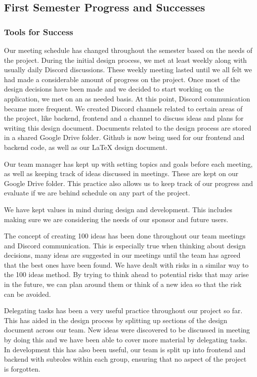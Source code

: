 \subsection{First Semester Progress and Successes}
\subsubsection{Tools for Success}
Our meeting schedule has changed throughout the semester based on the needs of the project. During the initial design process, we met at least weekly along with usually daily Discord discussions. These weekly meeting lasted until we all felt we had made a considerable amount of progress on the project. Once most of the design decisions have been made and we decided to start working on the application, we met on an as needed basis. At this point, Discord communication became more frequent. We created Discord channels related to certain areas of the project, like backend, frontend and a channel to discuss ideas and plans for writing this design document. Documents related to the design process are stored in a shared Google Drive folder. Github is now being used for our frontend and backend code, as well as our LaTeX design document. \par
Our team manager has kept up with setting topics and goals before each meeting, as well as keeping track of ideas discussed in meetings. These are kept on our Google Drive folder. This practice also allows us to keep track of our progress and evaluate if we are behind schedule on any part of the project. \par
We have kept values in mind during design and development. This includes making sure we are considering the needs of our sponsor and future users. \par
The concept of creating 100 ideas has been done throughout our team meetings and Discord communication. This is especially true when thinking about design decisions, many ideas are suggested in our meetings until the team has agreed that the best ones have been found. We have dealt with risks in a similar way to the 100 ideas method. By trying to think ahead to potential risks that may arise in the future, we can plan around them or think of a new idea so that the risk can be avoided. \par
Delegating tasks has been a very useful practice throughout our project so far. This has aided in the design process by splitting up sections of the design document across our team. New ideas were discovered to be discussed in meeting by doing this and we have been able to cover more material by delegating tasks. In development this has also been useful, our team is split up into frontend and backend with subroles within each group, ensuring that no aspect of the project is forgotten. \par

